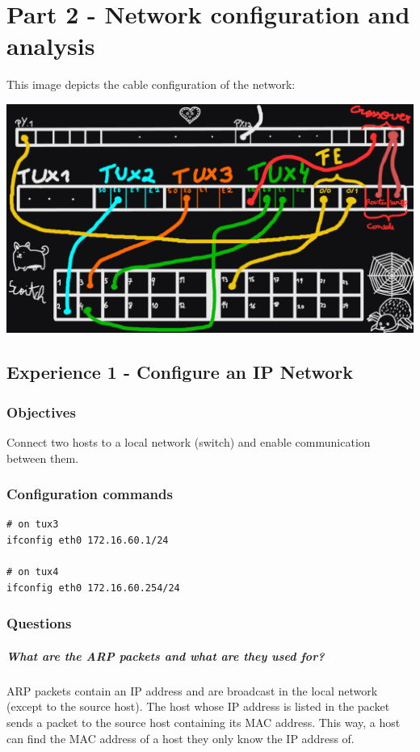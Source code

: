 \documentclass[11pt]{report}
\begin{document}
{\let\clearpage\relax\chapter{Part 2 - Network configuration and analysis}}

This image depicts the cable configuration of the network:

\includegraphics[width=1\textwidth]{images/rcom_proj2_cables.png}

\section{Experience 1 - Configure an IP Network}

\subsection{Objectives}
Connect two hosts to a local network (switch) and enable communication between
them.

\subsection{Configuration commands}
\begin{lstlisting}
# on tux3
ifconfig eth0 172.16.60.1/24

# on tux4
ifconfig eth0 172.16.60.254/24
\end{lstlisting}

\subsection{Questions}
\paragraph{What are the ARP packets and what are they used for?}
ARP packets contain an IP address and are broadcast in the local network
(except to the source host). The host whose IP address is listed in the packet
sends a packet to the source host containing its MAC address. This way,
a host can find the MAC address of a host they only know the IP address of.
\end{document}
